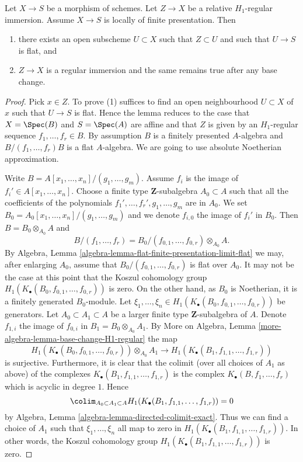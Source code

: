 \begin{lemma}
\label{lemma-flat-relative-H1-regular}
Let $X \to S$ be a morphism of schemes.
Let $Z \to X$ be a relative $H_1$-regular immersion.
Assume $X \to S$ is locally of finite presentation. Then
\begin{enumerate}
\item there exists an open subscheme $U \subset X$ such that
$Z \subset U$ and such that $U \to S$ is flat, and
\item $Z \to X$ is a regular immersion and the same remains
true after any base change.
\end{enumerate}
\end{lemma}

\begin{proof}
Pick $x \in Z$. To prove (1) suffices to find an open neighbourhood
$U \subset X$ of $x$ such that $U \to S$ is flat. Hence the lemma reduces
to the case that $X = \Spec(B)$ and $S = \Spec(A)$ are affine
and that $Z$ is given by an $H_1$-regular sequence $f_1, \ldots, f_r \in B$.
By assumption $B$ is a finitely presented $A$-algebra and
$B/(f_1, \ldots, f_r)B$ is a flat $A$-algebra. We are going to use
absolute Noetherian approximation.

\medskip\noindent
Write $B = A[x_1, \ldots, x_n]/(g_1, \ldots, g_m)$. Assume
$f_i$ is the image of $f_i' \in A[x_1, \ldots, x_n]$. Choose a finite type
$\mathbf{Z}$-subalgebra $A_0 \subset A$ such that all the coefficients
of the polynomials $f_1', \ldots, f_r', g_1, \ldots, g_m$ are in $A_0$.
We set $B_0 = A_0[x_1, \ldots, x_n]/(g_1, \ldots, g_m)$ and we denote
$f_{i, 0}$ the image of $f_i'$ in $B_0$. Then $B = B_0 \otimes_{A_0} A$
and
$$
B/(f_1, \ldots, f_r) =
B_0/(f_{0, 1}, \ldots, f_{0, r}) \otimes_{A_0} A.
$$
By
Algebra, Lemma \ref{algebra-lemma-flat-finite-presentation-limit-flat}
we may, after enlarging $A_0$, assume that
$B_0/(f_{0, 1}, \ldots, f_{0, r})$ is flat over $A_0$.
It may not be the case at this point that the Koszul cohomology group
$H_1(K_\bullet(B_0, f_{0, 1}, \ldots, f_{0, r}))$ is zero.
On the other hand, as $B_0$ is Noetherian, it is a finitely
generated $B_0$-module. Let
$\xi_1, \ldots, \xi_n \in H_1(K_\bullet(B_0, f_{0, 1}, \ldots, f_{0, r}))$
be generators. Let $A_0 \subset A_1 \subset A$ be a larger finite type
$\mathbf{Z}$-subalgebra of $A$. Denote $f_{1, i}$ the image
of $f_{0, i}$ in $B_1 = B_0 \otimes_{A_0} A_1$. By
More on Algebra, Lemma \ref{more-algebra-lemma-base-change-H1-regular}
the map
$$
H_1(K_\bullet(B_0, f_{0, 1}, \ldots, f_{0, r})) \otimes_{A_0} A_1
\longrightarrow
H_1(K_\bullet(B_1, f_{1, 1}, \ldots, f_{1, r}))
$$
is surjective. Furthermore, it is clear that the colimit (over all
choices of $A_1$ as above) of the
complexes $K_\bullet(B_1, f_{1, 1}, \ldots, f_{1, r})$ is the complex
$K_\bullet(B, f_1, \ldots, f_r)$ which is acyclic in degree $1$. Hence
$$
\colim_{A_0 \subset A_1 \subset A}
H_1(K_\bullet(B_1, f_{1, 1}, \ldots, f_{1, r}))
= 0
$$
by
Algebra, Lemma \ref{algebra-lemma-directed-colimit-exact}.
Thus we can find a choice of $A_1$ such that $\xi_1, \ldots, \xi_n$
all map to zero in $H_1(K_\bullet(B_1, f_{1, 1}, \ldots, f_{1, r}))$.
In other words, the Koszul cohomology group
$H_1(K_\bullet(B_1, f_{1, 1}, \ldots, f_{1, r}))$
is zero.


\end{proof}
